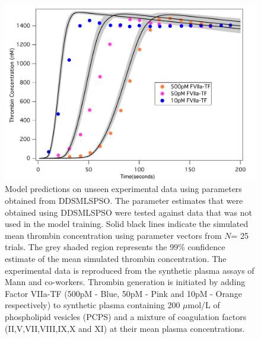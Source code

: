 \documentclass[12pt]{article}
\begin{document}
\begin{figure}[h]
\centering
\includegraphics[width=1.0\textwidth,height=0.5\textheight]{./figs/Figure_5_Sim_Validate_E2_E4_E6.pdf}
\caption{Model predictions on unseen experimental data using parameters obtained from DDSMLSPSO. The parameter estimates that were obtained using DDSMLSPSO were tested against data that was not used in the model training. Solid black lines indicate the simulated mean thrombin concentration using parameter vectors from $N$= 25 trials. The grey shaded region represents the 99\% confidence estimate of the mean simulated thrombin concentration. The experimental data is reproduced from the synthetic plasma assays of Mann and co-workers. Thrombin generation is initiated by adding Factor VIIa-TF (500pM - Blue, 50pM - Pink and 10pM - Orange respectively) to synthetic plasma containing 200 $\mu$mol/L of phospholipid vesicles (PCPS) and a mixture of coagulation factors (II,V,VII,VIII,IX,X and XI) at their mean plasma concentrations.
}\label{fig-validation}
\end{figure}



\clearpage

\renewcommand\thefigure{S\arabic{figure}}
\renewcommand\thetable{T\arabic{table}}
\renewcommand\thepage{S-\arabic{page}}
\renewcommand\theequation{S\arabic{equation}}
\end{document}
